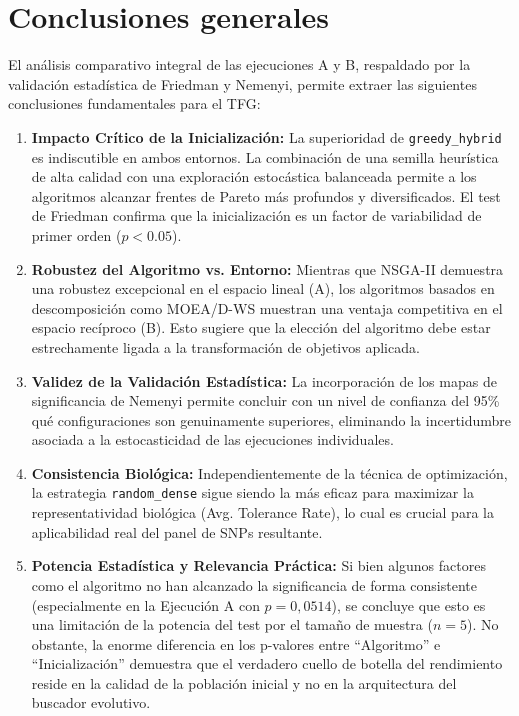 \documentclass[a4paper,10pt]{article}
\begin{document}
\section{Conclusiones generales}
El análisis comparativo integral de las ejecuciones A y B, respaldado por la validación estadística de Friedman y Nemenyi, permite extraer las siguientes conclusiones fundamentales para el TFG:

\begin{enumerate}
    \item \textbf{Impacto Crítico de la Inicialización:} La superioridad de \texttt{greedy\_hybrid} es indiscutible en ambos entornos. La combinación de una semilla heurística de alta calidad con una exploración estocástica balanceada permite a los algoritmos alcanzar frentes de Pareto más profundos y diversificados. El test de Friedman confirma que la inicialización es un factor de variabilidad de primer orden ($p < 0.05$).
    \item \textbf{Robustez del Algoritmo vs. Entorno:} Mientras que NSGA-II demuestra una robustez excepcional en el espacio lineal (A), los algoritmos basados en descomposición como MOEA/D-WS muestran una ventaja competitiva en el espacio recíproco (B). Esto sugiere que la elección del algoritmo debe estar estrechamente ligada a la transformación de objetivos aplicada.
    \item \textbf{Validez de la Validación Estadística:} La incorporación de los mapas de significancia de Nemenyi permite concluir con un nivel de confianza del 95\% qué configuraciones son genuinamente superiores, eliminando la incertidumbre asociada a la estocasticidad de las ejecuciones individuales.
    \item \textbf{Consistencia Biológica:} Independientemente de la técnica de optimización, la estrategia \texttt{random\_dense} sigue siendo la más eficaz para maximizar la representatividad biológica (Avg. Tolerance Rate), lo cual es crucial para la aplicabilidad real del panel de SNPs resultante.
    \item \textbf{Potencia Estadística y Relevancia Práctica:} Si bien algunos factores como el algoritmo no han alcanzado la significancia de forma consistente (especialmente en la Ejecución A con $p=0,0514$), se concluye que esto es una limitación de la potencia del test por el tamaño de muestra ($n=5$). No obstante, la enorme diferencia en los p-valores entre ``Algoritmo'' e ``Inicialización'' demuestra que el verdadero cuello de botella del rendimiento reside en la calidad de la población inicial y no en la arquitectura del buscador evolutivo.
\end{enumerate}
\end{document}
